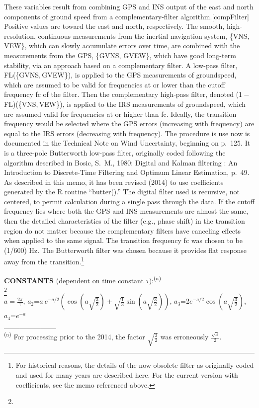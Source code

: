 \documentclass[
  english,
]{book}
\begin{document}
These variables result from combining GPS and INS output of the east and north components of ground speed from a complementary-filter algorithm.\protect\hypertarget{compFilter}{}{{[}compFilter{]}} Positive values are toward the east and north, respectively. The smooth, high-resolution, continuous measurements from the inertial navigation system, \{VNS, VEW\}, which can slowly accumulate errors over time, are combined with the measurements from the GPS, \{GVNS, GVEW\}, which have good long-term stability, via an approach based on a complementary filter. A low-pass filter, {FL(\{GVNS, GVEW\})}, is applied to the GPS measurements of groundspeed, which are assumed to be valid for frequencies at or lower than the cutoff frequency {fc} of the filter. Then the complementary high-pass filter, denoted ({1 − FL})({\{VNS, VEW\}}), is applied to the IRS measurements of groundspeed, which are assumed valid for frequencies at or higher than {fc}. Ideally, the transition frequency would be selected where the GPS errors (increasing with frequency) are equal to the IRS errors (decreasing with frequency).
The procedure is use now is documented in the Technical Note on Wind Uncertainty, beginning on p.~125. It is a three-pole Butterworth low-pass filter, originally coded following the algorithm described in Bosic, S.~M., 1980: Digital and Kalman filtering : An Introduction to Discrete-Time Filtering and Optimum Linear Estimation, p.~49. As described in this memo, it has been revised (2014) to use coefficients generated by the R routine ``butter().'' The digital filter used is recursive, not centered, to permit calculation during a single pass through the data. If the cutoff frequency lies where both the GPS and INS measurements are almost the same, then the detailed characteristics of the filter (e.g., phase shift) in the transition region do not matter because the complementary filters have canceling effects when applied to the same signal. The transition frequency {fc} was chosen to be (1/600) Hz. The Butterworth filter was chosen because it provides flat response away from the transition.\footnote{For historical reasons, the details of the now obsolete filter as originally coded and used for many years are described here. For the current version with coefficients, see the memo referenced above.}

\textbf{CONSTANTS} (dependent on time constant \(\tau\)):\textsuperscript{(a)}\\
\footnote{}\\
\(a=\frac{2\pi}{\tau}\),
\(a_{2}\)=\(a\ e^{-a/2}(\cos(a\sqrt{\frac{3}{2}})+\sqrt{\frac{1}{3}}\sin(a\sqrt{\frac{3}{2}}))\),
\(a_{3}\)=2\(e^{-a/2}\)\(\cos(a\sqrt{\frac{3}{2}})\), \(a_{4}\)=\(e^{-a}\)\\
\_\_\_\_\_\_\_\_\_\_\\
\textsuperscript{(a)} For processing prior to the 2014, the factor \(\sqrt{\frac{3}{2}}\)
was erroneously \(\frac{\sqrt{3}}{2}\).
\end{document}
